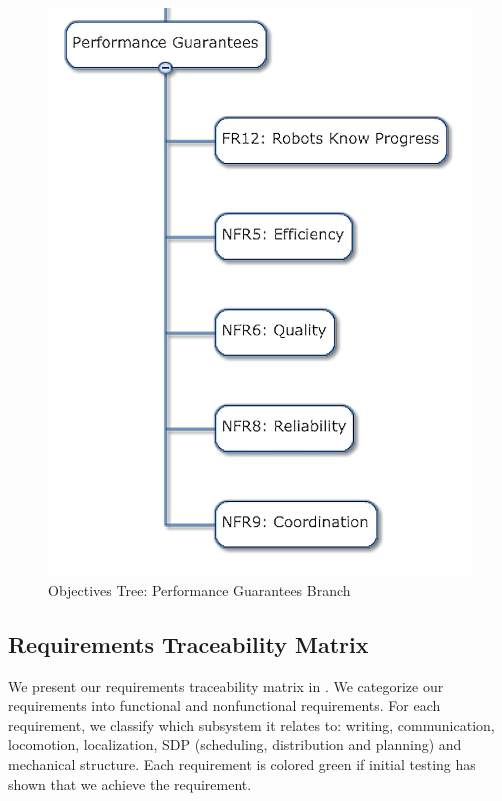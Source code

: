 \begin{figure}[!ht]
\centering
\includegraphics[width=0.98\columnwidth]{figs/objectives_tree/objectives_tree_performance.png}
\caption{Objectives Tree: Performance Guarantees Branch}
\label{fig:obj_tree_performance}
\end{figure}

\clearpage

\subsection{Requirements Traceability Matrix}
\label{sec:requirements_matrix}

We present our requirements traceability matrix in . We categorize our requirements into functional and nonfunctional requirements. For each requirement, we classify which subsystem it relates to: writing, communication, locomotion, localization, SDP (scheduling, distribution and planning) and mechanical structure. Each requirement is colored green if initial testing has shown that we achieve the requirement. 

